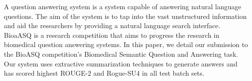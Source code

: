 A question answering system is a system capable of answering natural language questions. The aim of the system is to tap into the vast unstructured information and aid the researchers by providing a natural language search interface. BioaASQ is a research competition that aims to progress the research in biomedical question answering systems. In this paper, we detail our submission to the BioASQ competition's Biomedical Semantic Question and Answering task. Our system uses extractive summarization techniques to generate answers and has scored highest ROUGE-2 and Rogue-SU4 in all test batch sets.
